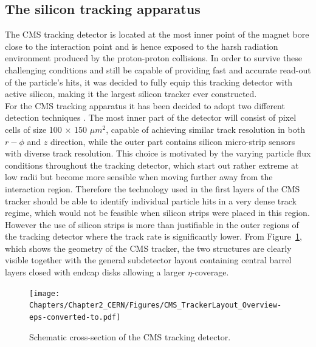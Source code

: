 \subsection{The silicon tracking apparatus}\label{sec::Tracker}
The CMS tracking detector is located at the most inner point of the magnet bore close to the interaction point and is hence exposed to the harsh radiation environment produced by the proton-proton collisions. In order to survive these challenging conditions and still be capable of providing fast and accurate read-out of the particle's hits, it was decided to fully equip this tracking detector with active silicon, making it the largest silicon tracker ever constructed.
\\
For the CMS tracking apparatus it has been decided to adopt two different detection techniques .
The most inner part of the detector will consist of pixel cells of size 100 $\times$ 150 $\unit{\mu m}^{2}$, capable of achieving similar track resolution in both $r-\phi$ and $z$ direction, while the outer part contains silicon micro-strip sensors with diverse track resolution. 
This choice is motivated by the varying particle flux conditions throughout the tracking detector, which start out rather extreme at low radii but become more sensible when moving further away from the interaction region. 
Therefore the technology used in the first layers of the CMS tracker should be able to identify individual particle hits in a very dense track regime, which would not be feasible when silicon strips were placed in this region. However the use of silicon strips is more than justifiable in the outer regions of the tracking detector where the track rate is significantly lower.
From Figure~\ref{fig::CMSTracker}, which shows the geometry of the CMS tracker, the two structures are clearly visible together with the general subdetector layout containing central barrel layers closed with endcap disks allowing a larger $\eta$-coverage.
\begin{figure}[h!t]
 \centering
 \texttt{[image: Chapters/Chapter2\_CERN/Figures/CMS\_TrackerLayout\_Overview-eps-converted-to.pdf]}
 \caption{Schematic cross-section of the CMS tracking detector.} \label{fig::CMSTracker}
\end{figure}

